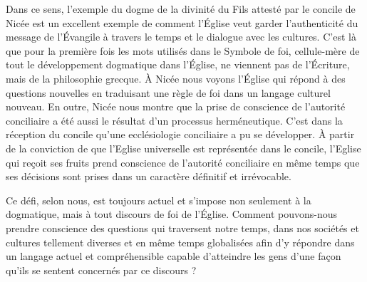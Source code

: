 \documentclass[12pt]{article} %
\begin{document}
Dans ce sens, l’exemple du dogme de la divinité du Fils attesté par le concile de Nicée est un excellent exemple de comment l’Église veut garder l’authenticité du message de l’Évangile à travers le temps et le dialogue avec les cultures. C’est là que pour la première fois les mots utilisés dans le Symbole de foi, cellule-mère de tout le développement dogmatique dans l’Église, ne viennent pas de l’Écriture, mais de la philosophie grecque. À Nicée nous voyons l’Église qui répond à des questions nouvelles en traduisant une règle de foi dans un langage culturel nouveau. En outre, Nicée nous montre que la prise de conscience de l’autorité conciliaire a été aussi le résultat d’un processus herméneutique. C’est dans la réception du concile qu’une ecclésiologie conciliaire a pu se développer. À partir de la conviction de que l’Eglise universelle est représentée dans le concile, l’Eglise qui reçoit ses fruits prend conscience de l’autorité conciliaire en même temps que ses décisions sont prises dans un caractère définitif et irrévocable. 

Ce défi, selon nous, est toujours actuel et s’impose non seulement à la dogmatique, mais à tout discours de foi de l’Église. Comment pouvons-nous prendre conscience des questions qui traversent notre temps, dans nos sociétés et cultures tellement diverses et en même temps globalisées afin d’y répondre dans un langage actuel et compréhensible capable d’atteindre les gens d’une façon qu’ils se sentent concernés par ce discours ?
\end{document}
